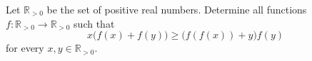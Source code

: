 Let $\mathbb{R}_{>0}$ be the set of positive real numbers. Determine all functions $f\colon \mathbb{R}_{>0} \to \mathbb{R}_{>0}$ such that
\[
x\bigl(f(x) + f(y)\bigr) \geq \bigl(f(f(x)) + y\bigr)f(y)
\]
for every $x, y \in \mathbb{R}_{>0}$.
